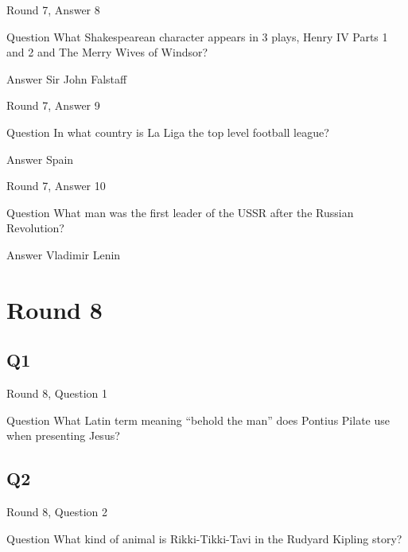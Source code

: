 \documentclass[11pt]{beamer}
\begin{document}
\begin{frame}[t]{Round 7, Answer 8}
\vspace{2em}
\begin{block}{Question}
What Shakespearean character appears in 3 plays, Henry IV Parts 1 and 2 and The Merry Wives of Windsor\@?
\end{block}
\pause{}
\begin{block}{Answer}
Sir John Falstaff
\end{block}
\end{frame}
    

\begin{frame}[t]{Round 7, Answer 9}
\vspace{2em}
\begin{block}{Question}
In what country is La Liga the top level football league\@?
\end{block}
\pause{}
\begin{block}{Answer}
Spain
\end{block}
\end{frame}
    

\begin{frame}[t]{Round 7, Answer 10}
\vspace{2em}
\begin{block}{Question}
What man was the first leader of the USSR after the Russian Revolution\@?
\end{block}
\pause{}
\begin{block}{Answer}
Vladimir Lenin
\end{block}
\end{frame}
    

\section{Round 8}
    

\subsection*{Q1}
\begin{frame}[t]{Round 8, Question 1}
\vspace{2em}
\begin{block}{Question}
What Latin term meaning ``behold the man'' does Pontius Pilate use when presenting Jesus\@?
\end{block}
\end{frame}
    

\subsection*{Q2}
\begin{frame}[t]{Round 8, Question 2}
\vspace{2em}
\begin{block}{Question}
What kind of animal is Rikki-Tikki-Tavi in the Rudyard Kipling story\@?
\end{block}
\end{frame}
    
\end{document}
